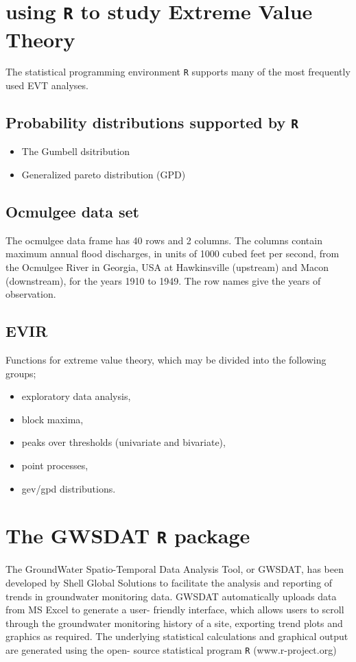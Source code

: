 \documentclass[12pt, a4paper]{article}
\theoremstyle{plain}
\theoremstyle{definition}
\theoremstyle{remark}
\begin{document}

\newpage
\section{using  \texttt{R}  to study Extreme Value Theory}
The statistical programming environment \texttt{R} supports many of the most frequently used EVT analyses.

\subsection{ Probability distributions supported by \texttt{R}}

\begin{itemize}
\item The Gumbell dsitribution
\item Generalized pareto distribution (GPD)
\end{itemize}


\subsection{Ocmulgee data set}

The ocmulgee data frame has 40 rows and 2 columns.
The columns contain maximum annual flood discharges, in units of 1000 cubed feet per second, from the Ocmulgee River in Georgia, USA at Hawkinsville (upstream) and Macon (downstream), for the years 1910 to 1949. The row names give the years of observation.

\subsection{EVIR}

Functions for extreme value theory, which may be divided into the following groups;
\begin{itemize}
\item exploratory data analysis,
\item block maxima,
\item peaks over thresholds (univariate and bivariate),
\item point processes,
\item gev/gpd distributions.
\end{itemize}


\section{The GWSDAT \texttt{R} package}
The GroundWater Spatio-Temporal Data Analysis Tool, or GWSDAT, has been
developed by Shell Global Solutions to facilitate the analysis and reporting of trends in groundwater monitoring
data. GWSDAT automatically uploads data from MS Excel to generate a user- friendly interface, which allows
users to scroll through the groundwater monitoring history of a site, exporting trend plots and graphics as required.
The underlying statistical calculations and graphical output are generated using the open- source statistical
program  \texttt{R} (www.r-project.org)
\end{document}
